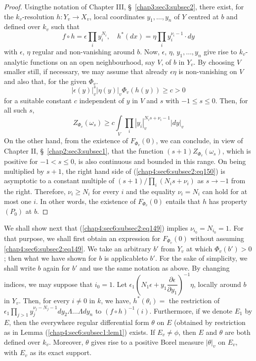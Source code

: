 \begin{proof}
Using\pageoriginale the notation of Chapter III,
\S\ \ref{chap3:sec3:subsec2}, there
exist, for the 
$k_{v}$-resolution $h:Y_{v}\to X_{v}$, local coordinates
$y_{1},\ldots,y_{n}$ of $Y$ centred at $b$ and defined over $k_{v}$
such that
$$
f\circ h=\epsilon\prod_{i}y^{N_{i}}_{i},\quad
h^{\ast}(dx)=\eta\prod_{i}y^{\nu_{i}-1}_{i}\cdot dy
$$
with $\epsilon$, $\eta$ regular and non-vanishing around $b$. Now,
$\epsilon$, $\eta$, $y_{1},\ldots,y_{n}$ give rise to $k_{v}$-analytic
functions on an open neighbourhood, say $V$, of $b$ in $Y_{v}$. By
choosing $V$ smaller still, if necessary, we may assume that already
$\epsilon\eta$ is non-vanishing on $V$ and also that, for the given
$\Phi_{v}$.
$$
|\epsilon(y)|^{s}_{v}|\eta(y)|_{v}\Phi_{v}(h(y))\geq c>0
$$
for a suitable constant $c$ independent of $y$ in $V$ and $s$ with
$-1\leq s\leq 0$. Then, for all such $s$,
\begin{equation*}
  Z_{\Phi_{v}}(\omega_{s})\geq
  c\int\limits_{V}\prod_{i}|y_{i}|_{v}^{N_{i}s+\nu_{i}-1}|dy|_{v}
  \tag{150}\label{chap4:sec6:subsec2:eq150} 
\end{equation*}
On the other hand, from the existence of $F_{\Phi_{v}}(0)$, we can
conclude, in view of Chapter II, \S\ \ref{chap2:sec3:subsec1}, that the function
$(s+1)Z_{\Phi_{v}}(\omega_{s})$, which is positive for $-1<s\leq 0$,
is also continuous and bounded in this range. On being multiplied by
$s+1$, the right hand side of (\ref{chap4:sec6:subsec2:eq150}) is asymptotic to a constant
multiple of $(s+1)/\prod\limits_{i}(N_{i}s+\nu_{i})$ as $s\to -1$ from
the right. Therefore, $\nu_{i}\geq N_{i}$ for every $i$ and the
equality $\nu_{i}=N_{i}$ can hold for at most one $i$. In other words,
the existence of $F_{\Phi_{v}}(0)$ entails that $h$ has property
$(P_{0})$ at $b$.
\end{proof}

We shall show next that (\ref{chap4:sec6:subsec2:eq149}) implies
$\nu_{i_{0}}=N_{i_{0}}=1$. For that purpose, we shall first obtain an
expression for $F_{\Phi_{v}}(0)$ without
assuming \ref{chap4:sec6:subsec2:eq149}. We take
an arbitrary $b'$ from $Y_{v}$ at which $\Phi_{v}(b')>0$; then what we
have shown for $b$ is applicable\pageoriginale to $b'$. For the sake
of simplicity, we shall write $b$ again for $b'$ and use the same
notation as above. By changing indices, we may suppose that
$i_{0}=1$. Let
$\epsilon_{1}\left(N_{1}\epsilon+y_{1}\dfrac{\partial\epsilon}{\partial
  y_{1}}\right)^{-1}\eta$, locally around $b$ in $Y_{v}$. Then, for
every $i\neq 0$ in $k$, we have, $h^{\ast}(\theta_{i})=$ the
restriction of
$\epsilon_{1}\prod_{j>1}y^{\nu_{j}-N_{j}-1}_{j}dy_{2}\Lambda\ldots\Lambda
dy_{n}$ to $(f\circ h)^{-1}(i)$. Furthermore, if we denote $E_{1}$ by
$E$, then the everywhere regular differential form $\theta$ on $E$
(obtained by restriction as in Lemma (\ref{chap4:sec6:subsec1:lem1}) exists. If
$E_{v}\neq\phi$, then $E$ and $\theta$ are both defined over
$k_{v}$. Moreover, $\theta$ gives rise to a positive Borel measure
$|\theta|_{v}$ on $E_{v}$, with $E_{v}$ as its exact support.

